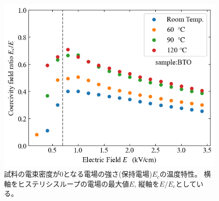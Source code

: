 \documentclass[9pt,dvipdfmx,a4paper]{jsarticle}
\begin{document}
\begin{figure}[H]
\begin{minipage}{0.4\columnwidth}
        \includegraphics[width=\columnwidth]{BTO_Ec-E.png}
        \caption{\small{試料の電束密度が0となる電場の強さ(保持電場)\(E_c\)の温度特性。
        横軸をヒステリシスループの電場の最大値\(E\), 縦軸を\(E/E_c\)としている。}}
        \label{graph:BTO_Ec-E}
    \end{minipage}
\end{figure}
\end{document}
